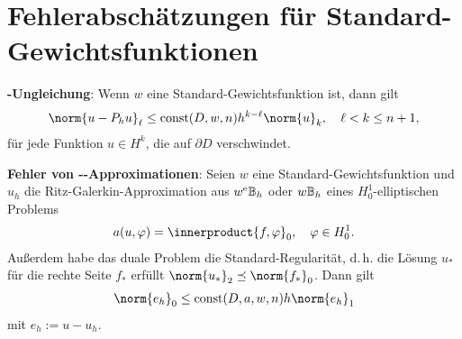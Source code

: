 \section{%
    Fehlerabschätzungen für Standard-Gewichtsfunktionen%
}

\textbf{-Ungleichung}:
Wenn $w$ eine Standard-Gewichtsfunktion ist, dann gilt
\begin{align*}
    \norm{u - P_h u}_\ell \le \const(D, w, n) h^{k-\ell} \norm{u}_k,\quad
    \ell < k \le n + 1,
\end{align*}
für jede Funktion $u \in H^k$, die auf $\partial D$ verschwindet.

\textbf{Fehler von --Approximationen}:
Seien $w$ eine Standard-Gewichtsfunktion und
$u_h$ die Ritz-Galerkin-Approximation aus $w^{\mathrm{e}}\mathbb{B}_h$ oder $w\mathbb{B}_h$ eines $H_0^1$-elliptischen
Problems
\begin{align*}
    a(u, \varphi) = \innerproduct{f, \varphi}_0,\quad
    \varphi \in H_0^1.
\end{align*}
Außerdem habe das duale Problem die Standard-Regularität, d.\,h.
die Lösung $u_\ast$ für die rechte Seite $f_\ast$ erfüllt
$\norm{u_\ast}_2 \preceq \norm{f_\ast}_0$.
Dann gilt
\begin{align*}
    \norm{e_h}_0
    \le \const(D, a, w, n) h \norm{e_h}_1
\end{align*}
mit $e_h := u - u_h$.

\pagebreak
